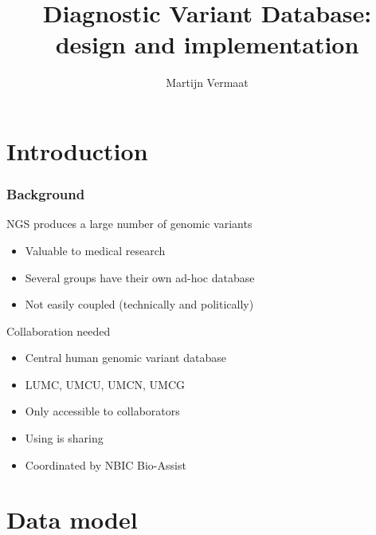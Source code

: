 \documentclass[slidestop]{beamer}
\title{Diagnostic Variant Database:\\ design and implementation}
\author{Martijn Vermaat}
\begin{document}

\bodytemplate


\section{Introduction}

\begin{frame}
  \frametitle{Background}
  NGS produces a large number of genomic variants
  \begin{itemize}
    \item Valuable to medical research
    \item Several groups have their own ad-hoc database
    \item Not easily coupled (technically and politically)
  \end{itemize}
  \vspace{1cm}
  \pause
  Collaboration needed
  \begin{itemize}
    \item Central human genomic variant database
    \item LUMC, UMCU, UMCN, UMCG
    \item Only accessible to collaborators
    \item Using is sharing
    \item Coordinated by NBIC Bio-Assist
  \end{itemize}
\end{frame}

\section{Data model}
\end{document}
